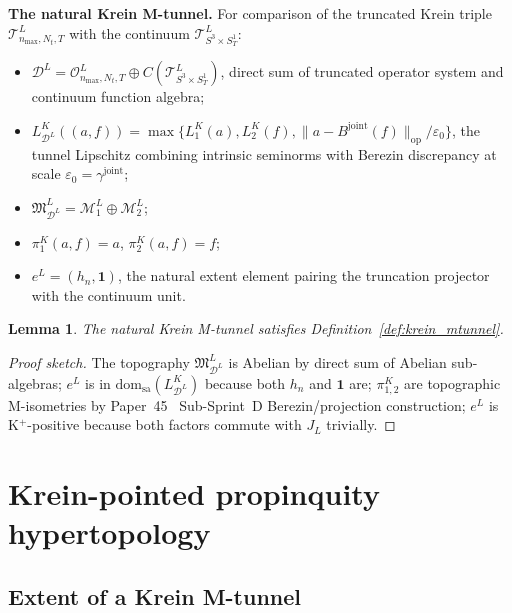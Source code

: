 \documentclass[11pt,a4paper]{article}
\theoremstyle{plain}
\newtheorem{lemma}[theorem]{Lemma}
\theoremstyle{definition}
\newcommand{\nmax}{n_{\max}}
\newcommand{\Nt}{N_{t}}
\newcommand{\Manifold}{S^{3}\times S^{1}_{T}}
\newcommand{\Op}{\mathcal{O}}
\newcommand{\Tcal}{\mathcal{T}}
\newcommand{\Mcal}{\mathcal{M}}
\newcommand{\Dcal}{\mathcal{D}}
\newcommand{\opnorm}[1]{\lVert #1 \rVert_{\mathrm{op}}}
\newcommand{\JL}{J_{L}}
\newcommand{\Bjoint}{B^{\mathrm{joint}}}
\newcommand{\gammajoint}{\gamma^{\mathrm{joint}}}
\begin{document}
\textbf{The natural Krein M-tunnel.} For comparison of the
truncated Krein triple $\Tcal^{L}_{\nmax, \Nt, T}$ with the
continuum $\Tcal^{L}_{\Manifold}$:
\begin{itemize}
\item $\Dcal^{L} = \Op^{L}_{\nmax, \Nt, T} \oplus C(\Tcal^{L}_{\Manifold})$,
direct sum of truncated operator system and continuum function algebra;
\item $L_{\Dcal^{L}}^{K}((a, f)) = \max\{L^{K}_{1}(a), L^{K}_{2}(f),
\opnorm{a - \Bjoint(f)}/\varepsilon_{0}\}$, the tunnel Lipschitz
combining intrinsic seminorms with Berezin discrepancy at scale
$\varepsilon_{0} = \gammajoint$;
\item $\mathfrak{M}_{\Dcal^{L}}^{L} = \Mcal^{L}_{1} \oplus \Mcal^{L}_{2}$;
\item $\pi_{1}^{K}(a, f) = a$, $\pi_{2}^{K}(a, f) = f$;
\item $e^{L} = (h_{n}, \mathbf{1})$, the natural extent element
pairing the truncation projector with the continuum unit.
\end{itemize}

\begin{lemma}\label{lem:natural_mtunnel}
The natural Krein M-tunnel satisfies Definition~\ref{def:krein_mtunnel}.
\end{lemma}

\begin{proof}[Proof sketch]
The topography $\mathfrak{M}_{\Dcal^{L}}^{L}$ is Abelian by direct
sum of Abelian sub-algebras; $e^{L}$ is in
$\mathrm{dom}_{\mathrm{sa}}(L_{\Dcal^{L}}^{K})$ because both
$h_{n}$ and $\mathbf{1}$ are; $\pi_{1, 2}^{K}$ are topographic
M-isometries by Paper~45~\cite{paper45} Sub-Sprint~D
Berezin/projection construction; $e^{L}$ is K$^{+}$-positive because
both factors commute with $\JL$ trivially.
\end{proof}

\section{Krein-pointed propinquity
hypertopology}\label{sec:krein_hypertopology}

\subsection{Extent of a Krein M-tunnel}\label{sec:krein_extent}
\end{document}
